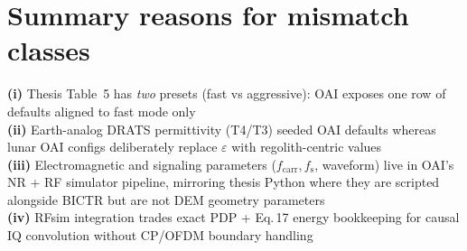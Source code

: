 \documentclass[11pt,a4paper]{article}
\begin{document}
\section*{Summary reasons for mismatch classes}
\textbf{(i)} Thesis Table~5 has \emph{two} presets (fast vs aggressive): OAI exposes one row of defaults aligned to fast mode only\\
\textbf{(ii)} Earth-analog DRATS permittivity (T4/T3) seeded OAI defaults whereas lunar OAI configs deliberately replace $\varepsilon$ with regolith-centric values\\
\textbf{(iii)} Electromagnetic and signaling parameters ($f_{\mathrm{carr}}, f_{\mathrm{s}}$, waveform)
live in OAI's NR + RF simulator pipeline, mirroring thesis Python where they are scripted alongside BICTR but are not DEM geometry parameters\\
\textbf{(iv)} RFsim integration trades exact PDP + Eq.\,17 energy bookkeeping for causal IQ convolution without CP/OFDM boundary handling
\end{document}
